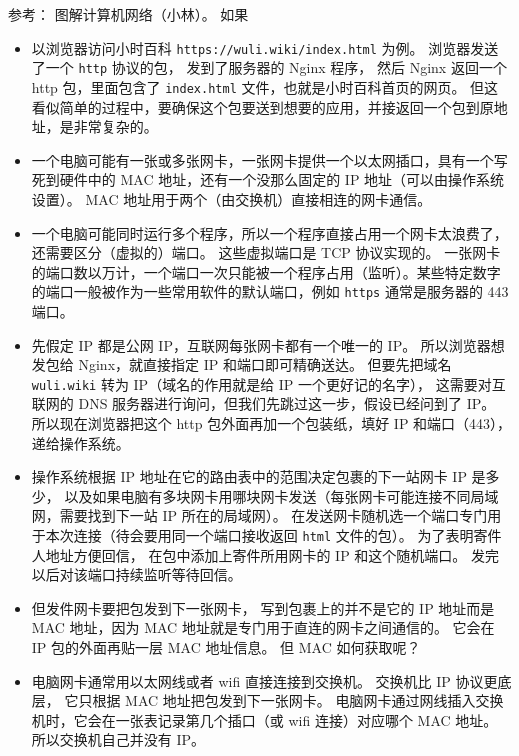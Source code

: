 
\begin{issues}
\issueDraft
\end{issues}

参考： 图解计算机网络（小林）。 如果

\begin{itemize}
\item 以浏览器访问小时百科 \verb`https://wuli.wiki/index.html` 为例。 浏览器发送了一个 \verb`http` 协议的包， 发到了服务器的 Nginx 程序， 然后 Nginx 返回一个 http 包，里面包含了 \verb`index.html` 文件，也就是小时百科首页的网页。 但这看似简单的过程中，要确保这个包要送到想要的应用，并接返回一个包到原地址，是非常复杂的。
\item 一个电脑可能有一张或多张网卡，一张网卡提供一个以太网插口，具有一个写死到硬件中的 MAC 地址，还有一个没那么固定的 IP 地址（可以由操作系统设置）。 MAC 地址用于两个（由交换机）直接相连的网卡通信。
\item 一个电脑可能同时运行多个程序，所以一个程序直接占用一个网卡太浪费了，还需要区分（虚拟的）端口。 这些虚拟端口是 TCP 协议实现的。 一张网卡的端口数以万计，一个端口一次只能被一个程序占用（监听）。某些特定数字的端口一般被作为一些常用软件的默认端口，例如 \verb`https` 通常是服务器的 443 端口。
\item 先假定 IP 都是公网 IP，互联网每张网卡都有一个唯一的 IP。 所以浏览器想发包给 Nginx，就直接指定 IP 和端口即可精确送达。 但要先把域名 \verb`wuli.wiki` 转为 IP（域名的作用就是给 IP 一个更好记的名字）， 这需要对互联网的 DNS 服务器进行询问，但我们先跳过这一步，假设已经问到了 IP。 所以现在浏览器把这个 http 包外面再加一个包装纸，填好 IP 和端口（443），递给操作系统。
\item 操作系统根据 IP 地址在它的路由表中的范围决定包裹的下一站网卡 IP 是多少， 以及如果电脑有多块网卡用哪块网卡发送（每张网卡可能连接不同局域网，需要找到下一站 IP 所在的局域网）。 在发送网卡随机选一个端口专门用于本次连接（待会要用同一个端口接收返回 \verb`html` 文件的包）。 为了表明寄件人地址方便回信， 在包中添加上寄件所用网卡的 IP 和这个随机端口。 发完以后对该端口持续监听等待回信。
\item 但发件网卡要把包发到下一张网卡， 写到包裹上的并不是它的 IP 地址而是 MAC 地址，因为 MAC 地址就是专门用于直连的网卡之间通信的。 它会在 IP 包的外面再贴一层 MAC 地址信息。 但 MAC 如何获取呢？
\item 电脑网卡通常用以太网线或者 wifi 直接连接到交换机。 交换机比 IP 协议更底层， 它只根据 MAC 地址把包发到下一张网卡。 电脑网卡通过网线插入交换机时，它会在一张表记录第几个插口（或 wifi 连接）对应哪个 MAC 地址。 所以交换机自己并没有 IP。

\end{itemize}
